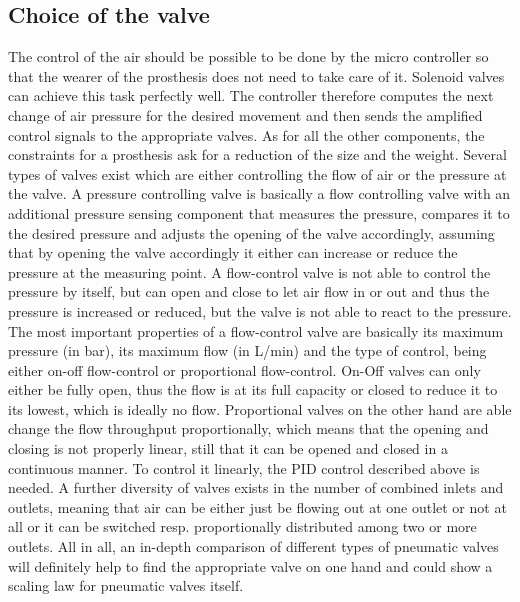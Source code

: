\documentclass[main]{subfiles}
\begin{document}
\subsection{Choice of the valve}
\label{valve}
The control of the air should be possible to be done by the micro controller so that the wearer of the prosthesis does not need to take care of it. Solenoid valves can achieve this task perfectly well. The controller therefore computes the next change of air pressure for the desired movement and then sends the amplified control signals to the appropriate valves. As for all the other components, the constraints for a prosthesis ask for a reduction of the size and the weight. Several types of valves exist which are either controlling the flow of air or the pressure at the valve. A pressure controlling valve is basically a flow controlling valve with an additional pressure sensing component that measures the pressure, compares it to the desired pressure and adjusts the opening of the valve accordingly, assuming that by opening the valve accordingly it either can increase or reduce the pressure at the measuring point. A flow-control valve is not able to control the pressure by itself, but can open and close to let air flow in or out and thus the pressure is increased or reduced, but the valve is not able to react to the pressure. The most important properties of a flow-control valve are basically its maximum pressure (in bar), its maximum flow (in L/min) and the type of control, being either on-off flow-control or proportional flow-control. On-Off valves can only either be fully open, thus the flow is at its full capacity or closed to reduce it to its lowest, which is ideally no flow. Proportional valves on the other hand are able change the flow throughput proportionally, which means that the opening and closing is not properly linear, still that it can be opened and closed in a continuous manner. To control it linearly, the PID control described above is needed. A further diversity of valves exists in the number of combined inlets and outlets, meaning that air can be either just be flowing out at one outlet or not at all or it can be switched resp. proportionally distributed among two or more outlets. All in all, an in-depth comparison of different types of pneumatic valves will definitely help to find the appropriate valve on one hand and could show a scaling law for pneumatic valves itself.
\end{document}
